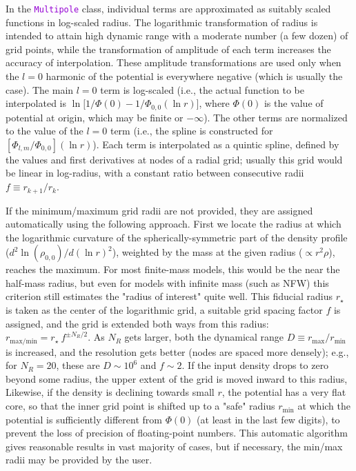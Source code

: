 \documentclass[12pt]{article}
\newcommand{\ttt}[1]{\textcolor{darkviolet}{\texttt{#1}}}
\begin{document}
In the \ttt{Multipole} class, individual terms are approximated as suitably scaled functions in log-scaled radius. The logarithmic transformation of radius is intended to attain high dynamic range with a moderate number (a few dozen) of grid points, while the transformation of amplitude of each term increases the accuracy of interpolation. These amplitude transformations are used only when the $l=0$ harmonic of the potential is everywhere negative (which is usually the case). The main $l=0$ term is log-scaled (i.e., the actual function to be interpolated is $\ln\big[1/\Phi(0)-1/\Phi_{0,0}(\ln r)\big]$, where $\Phi(0)$ is the value of potential at origin, which may be finite or $-\infty$). The other terms are normalized to the value of the $l=0$ term (i.e., the spline is constructed for $[\Phi_{l,m}/\Phi_{0,0}](\ln r)$). Each term is interpolated as a quintic spline, defined by the values and first derivatives at nodes of a radial grid; usually this grid would be linear in log-radius, with a constant ratio between consecutive radii $f\equiv r_{k+1}/r_k$.

If the minimum/maximum grid radii are not provided, they are assigned automatically using the following approach. First we locate the radius at which the logarithmic curvature of the spherically-symmetric part of the density profile ($d^2\ln(\rho_{0,0})/d(\ln r)^2$), weighted by the mass at the given radius ($\propto r^2\rho$), reaches the maximum. For most finite-mass models, this would be the near the half-mass radius, but even for models with infinite mass (such as NFW) this criterion still estimates the "radius of interest" quite well. This fiducial radius $r_\star$ is taken as the center of the logarithmic grid, a suitable grid spacing factor $f$ is assigned, and the grid is extended both ways from this radius: $r_\mathrm{max/min} = r_\star\: f^{\pm N_R/2}$. As $N_R$ gets larger, both the dynamical range $D\equiv r_\mathrm{max}/r_\mathrm{min}$ is increased, and the resolution gets better (nodes are spaced more densely); e.g., for $N_R=20$, these are $D\sim 10^6$ and $f\sim 2$. If the input density drops to zero beyond some radius, the upper extent of the grid is moved inward to this radius, Likewise, if the density is declining towards small $r$, the potential has a very flat core, so that the inner grid point is shifted up to a "safe" radius $r_\mathrm{min}$ at which the potential is sufficiently different from $\Phi(0)$ (at least in the last few digits), to prevent the loss of precision of floating-point numbers. This automatic algorithm gives reasonable results in vast majority of cases, but if necessary, the min/max radii may be provided by the user.
\end{document}
